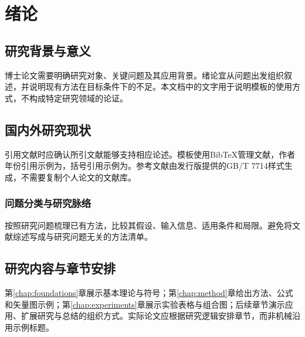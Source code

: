 \chapter{绪论}\label{chap:introduction}
\section{研究背景与意义}
博士论文需要明确研究对象、关键问题及其应用背景。绪论宜从问题出发组织叙述，并说明现有方法在目标条件下的不足。本文档中的文字用于说明模板的使用方式，不构成特定研究领域的论证。

\section{国内外研究现状}
引用文献时应确认所引文献能够支持相应论述。模板使用BibTeX管理文献，作者年份引用示例为\citet{knuth1984}，括号引用示例为\citep{lamport1994}。参考文献由发行版提供的GB/T 7714样式生成，不需要复制个人论文的文献库。

\subsection{问题分类与研究脉络}
按照研究问题梳理已有方法，比较其假设、输入信息、适用条件和局限。避免将文献综述写成与研究问题无关的方法清单。

\section{研究内容与章节安排}
第\ref{chap:foundations}章展示基本理论与符号；第\ref{chap:method}章给出方法、公式和矢量图示例；第\ref{chap:experiments}章展示实验表格与组合图；后续章节演示应用、扩展研究与总结的组织方式。实际论文应根据研究逻辑安排章节，而非机械沿用示例标题。
